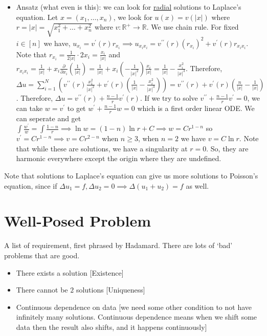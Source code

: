 \documentclass{article}
\theoremstyle{definition}
\begin{document}
\begin{itemize}
    \item Ansatz (what even is this): we can look for \underline{radial} solutions to Laplace's equation. Let \(x = (x_1, \dots, x_n )\), we look for \(u(x) = v(\vert x \vert )\) where \(r = \vert x \vert = \sqrt{x_1^2 + \dots + x_n^2}\) where \(v:\mathbb{R} ^+ \to \mathbb{R} \). We use chain rule. For fixed \(i\in [n]\) we have, \(u_{x_i} = v^{\prime} (r) r_{x_{i}} \implies u_{x_i x_i} = v^{\prime\prime} (r) (r_{x_i})^2 + v^{\prime} (r) r_{x_i x_i}\). Note that \(r_{x_i} = \frac{1}{2|x|}\cdot 2x_i = \frac{x_i}{\vert x \vert }\) and \(r_{x_i x_i} = \frac{1}{|x|} + x_i \frac{\partial }{\partial x_i} \left( \frac{1}{\vert x \vert } \right) = \frac{1}{\vert x \vert } + x_i \left( - \frac{1}{\vert x \vert ^2} \right) \frac{x_i}{|x|} = \frac{1}{\vert x \vert } - \frac{x_i^2}{\vert x \vert ^3} \). Therefore, \(\Delta u = \sum_{i=1}^{N} \left( v^{\prime\prime} (r) \frac{x_1^2}{|x|^2} + v^{\prime} (r)\left( \frac{1}{\vert x \vert }-\frac{x_i^2}{|x|^3} \right)  \right) = v^{\prime\prime} (r) + v^{\prime} (r) \left( \frac{n}{\vert x \vert } - \frac{1}{\vert x \vert } \right)  \). Therefore, \(\Delta u = v^{\prime\prime} (r) + \frac{n-1}{r}v^{\prime} (r)\). If we try to solve \(v^{\prime\prime} +\frac{n-1}{r} v^{\prime} = 0\), we can take \(w=v^{\prime} \) to get \(w^{\prime} + \frac{n-1}{r}w = 0\) which is a first order linear ODE. We can seperate and get \(\int \frac{w^{\prime}}{w} = \int \frac{1-n}{r} \implies \ln w = (1-n) \ln r + C \implies w = C r^{1-n} \) so \(v^{\prime} = C r^{1-n} \implies v = C r^{2-n} \) when \(n \geq 3\), when \(n=2\) we have \(v = C \ln r\). Note that while these are solutions, we have a singularity at \(r=0\). So, they are harmonic everywhere except the origin where they are undefined.    
\end{itemize}

Note that solutions to Laplace's equation can give us more solutions to Poisson's equation, since if \(\Delta u_1 = f, \Delta u_2 = 0 \implies \Delta (u_1 + u_2) = f\) as well.

\section*{Well-Posed Problem}

A list of requirement, first phrased by Hadamard. There are lots of `bad' problems that are good.

\begin{itemize}
    \item There exists a solution [Existence]
    \item There cannot be \(2\) solutions [Uniqueness]
    \item Continuous dependence on data [we need some other condition to not have infinitely many solutions. Continuous dependence means when we shift some data then the result also shifts, and it happens continuously]
\end{itemize}
\end{document}
